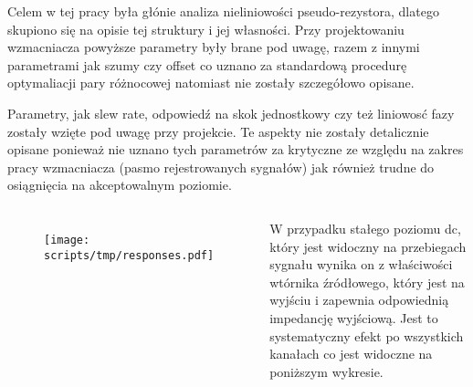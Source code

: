 \begin{frame}[t]
    \vspace{-1em}
    \begin{block}{\dk}
        {\renewcommand\normalsize{\small}%
        \normalsize
        }
    \end{block}
    {\renewcommand\normalsize{\small}%
    \normalsize
Celem w tej pracy była głónie analiza nieliniowości pseudo-rezystora, dlatego skupiono się na opisie tej struktury i jej własności.  Przy projektowaniu wzmacniacza powyższe  parametry  były brane pod uwagę, razem z innymi parametrami jak szumy czy offset co uznano za standardową procedurę optymaliacji pary różnocowej natomiast nie zostały szczegółowo opisane.


Parametry,  jak slew rate, odpowiedź na skok jednostkowy czy też liniowosć fazy zostały wzięte pod uwagę przy projekcie. Te aspekty nie zostały detalicznie opisane ponieważ nie uznano tych parametrów za krytyczne ze względu na zakres pracy wzmacniacza (pasmo rejestrowanych sygnałów) jak również trudne do osiągnięcia na akceptowalnym poziomie. 
    }
\end{frame}

\begin{frame}[t]
    \begin{columns}

\vspace{-1em}
        \begin{figure}
            \centering
            \texttt{[image: scripts/tmp/responses.pdf]}
        \end{figure}
        W przypadku stałego poziomu dc, który jest widoczny na przebiegach sygnału wynika on z właściwości wtórnika źródłowego, który jest na wyjściu i zapewnia odpowiednią impedancję wyjściową. Jest to systematyczny efekt po wszystkich kanałach co jest widoczne na poniższym wykresie. 

    \end{columns}


\end{frame}




